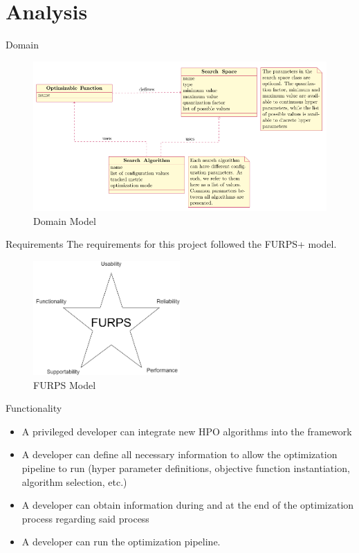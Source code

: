 \documentclass[10pt]{beamer}
\begin{document}
  \section{Analysis}
  \begin{frame}{Domain}
    \begin{figure}
      \includegraphics[width=\textwidth]{images/domain_model.png}
      \caption*{Domain Model}
    \end{figure}
  \end{frame}
  \begin{frame}{Requirements}
    The requirements for this project followed the FURPS+ model.
    \begin{figure}[H]
      \centering
      \includegraphics[width=0.5\textwidth]{images/furps.png}
      \caption*{FURPS Model}
    \end{figure}
  \end{frame}
  \begin{frame}{Functionality}
    \begin{itemize}
      \item A privileged developer can integrate new HPO algorithms into the framework
      \item A developer can define all necessary information to allow the optimization pipeline to run (hyper parameter definitions, objective function instantiation, algorithm selection, etc.)
      \item A developer can obtain information during and at the end of the optimization process regarding said process
      \item A developer can run the optimization pipeline.
    \end{itemize}
  \end{frame}
\end{document}

